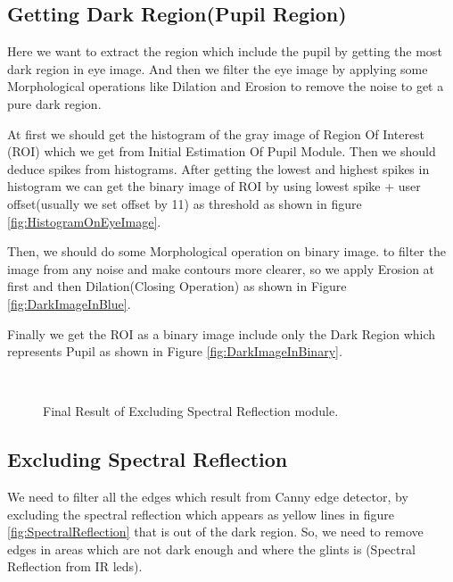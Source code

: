 \subsection{Getting Dark Region(Pupil Region)} 
Here we want to extract the region which include the pupil by getting the most dark region in eye image. And then we filter the eye image by applying some Morphological operations like Dilation and Erosion to remove the noise to get a pure dark region. \bigskip

At first we should get the histogram of the gray image of Region Of Interest (ROI) which we get from Initial Estimation Of Pupil Module. Then we should deduce spikes from histograms. After getting the lowest and highest spikes in histogram we can get the binary image of ROI by using lowest spike +  user offset(usually we set offset by 11) as threshold as shown in figure \ref{fig:HistogramOnEyeImage}. \bigskip

Then, we should do some Morphological operation on binary image. to filter the image from any noise and make contours more clearer, so we apply Erosion at first and then Dilation(Closing Operation) as shown in Figure \ref{fig:DarkImageInBlue}. \bigskip

Finally we get the ROI as a binary image include only the Dark Region which represents Pupil as shown in Figure \ref{fig:DarkImageInBinary}.


\begin{figure}[]
\begin{dBox}
\centering
  \mbox{
   }
   \caption{Final Result of Excluding Spectral Reflection module.
   \label{fig:Edges} }   
\end{dBox}   
\end{figure}

\subsection{Excluding Spectral Reflection} 
	We need to filter all the edges which result from Canny edge detector, by excluding the spectral reflection which appears as yellow lines in figure \ref{fig:SpectralReflection} that is out of the dark region. So, we need to remove edges in areas which are not dark enough and where the glints is (Spectral Reflection from IR leds).\bigskip
		
